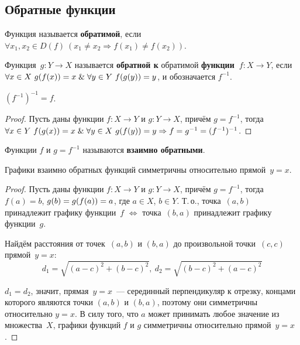 \subsection{Обратные функции}
 Функция называется \textbf{обратимой}, если $\forall x_1, x_2 \in D(f) \ (x_1 \neq x_2 \Rightarrow f(x_1) \neq f(x_2))$.

 Функция~$g \colon Y \to X$ называется \textbf{обратной к} обратимой \textbf{функции~$f \colon X \to Y$}, если $\forall x \in X \ g(f(x)) = x \opbr\lAnd \forall y \in Y \ f(g(y)) = y$, и обозначается $f^{-1}$.

\begin{statement}
$(f^{-1})^{-1} = f$.
\end{statement}
\begin{proof}
Пусть даны функции $f \colon X \to Y$ и $g \colon Y \to X$, причём $g = f^{-1}$, тогда
$\forall x \in Y \ f(g(x)) = x \opbr\lAnd \forall y \in X \ g(f(y)) = y \Rightarrow f = g^{-1} = (f^{-1})^{-1}$.
\end{proof}

Функции $f$ и $g = f^{-1}$ называются \textbf{взаимно обратными}.

\begin{theorem}
Графики взаимно обратных функций симметричны относительно прямой~$y = x$.
\end{theorem}
\begin{proof}
Пусть даны функции $f \colon X \to Y$ и $g \colon Y \to X$, причём $g = f^{-1}$, тогда $f(a) = b$, $g(b) \opbr= g(f(a)) \opbr= a$, где $a \in X$, $b \in Y$.
Т.\,о., точка~$(a, b)$ принадлежит графику функции~$f$ $\Leftrightarrow$ точка~$(b, a)$ принадлежит графику функции~$g$.

Найдём расстояния от точек~$(a, b)$ и $(b, a)$ до произвольной точки~$(c, c)$ прямой~$y = x$:
\begin{equation*}
d_1 = \sqrt{(a - c)^2 + (b - c)^2}, \
d_2 = \sqrt{(b - c)^2 + (a - c)^2}
\end{equation*}

$d_1 = d_2$, значит, прямая~$y = x$~--- серединный перпендикуляр к отрезку, концами которого являются точки $(a, b)$ и $(b, a)$, поэтому они симметричны относительно $y = x$.
В силу того, что $a$ может принимать любое значение из множества~$X$, графики функций $f$ и $g$ симметричны относительно прямой~$y = x$.
\end{proof}